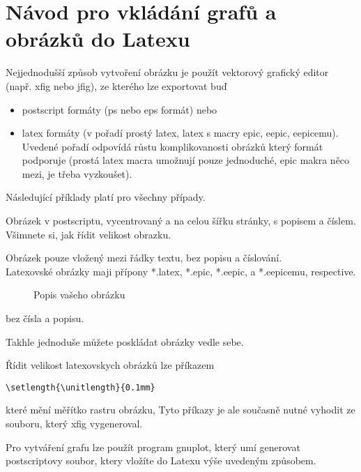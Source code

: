 \documentclass[12pt]{article}
\begin{document}
\appendix

\section{Návod pro vkládání grafů a obrázků do Latexu}

Nejjednodušší způsob vytvoření obrázku je použít vektorový grafický
editor (např. xfig nebo jfig), ze kterého lze exportovat buď
\begin{itemize}
\item postscript formáty (ps nebo eps formát) nebo
\item latex formáty (v pořadí prostý latex, latex s macry epic, eepic, eepicemu). Uvedené pořadí odpovídá růstu
komplikovanosti obrázků který formát podporuje (prostá latex macra
umožnují pouze jednoduché, epic makra něco mezi, je třeba
vyzkoušet).

\end{itemize}
Následující příklady platí pro všechny případy.

Obrázek v postscriptu, vycentrovaný a na celou šířku stránky, s
popisem a číslem. Všimnete si, jak řídit velikost obrazku.

Obrázek pouze vložený mezi řádky textu, bez popisu a číslování.\\

Latexovské obrázky maji přípony *.latex, *.epic, *.eepic, a
*.eepicemu, respective.
\begin{figure}[ht]
\begin{center}
\end{center}
\caption{Popis vašeho obrázku} \label{l1}
\end{figure}

bez čísla a popisu.

Takhle jednoduše můžete poskládat obrázky vedle sebe.

Řídit velikost latexovskych obrázků lze příkazem
\begin{verbatim}
\setlength{\unitlength}{0.1mm}
\end{verbatim}
které mění měřítko rastru obrázku, Tyto příkazy je ale současně
nutné vyhodit ze souboru, který xfig vygeneroval.

Pro vytváření grafu lze použít program gnuplot, který umí generovat
postscriptovy soubor, ktery vložíte do Latexu výše uvedeným
způsobem.
\end{document}
